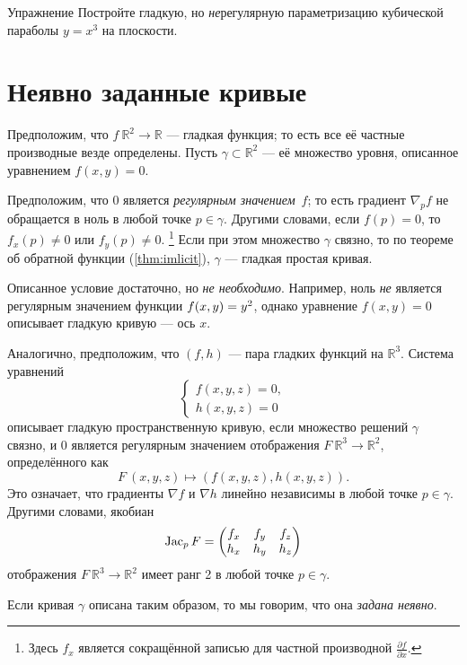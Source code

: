 \begin{thm}{Упражнение}\label{ex:nonregular}
Постройте гладкую, но \textit{не}регулярную параметризацию кубической параболы $y=x^3$ на плоскости.
\end{thm}

\section{Неявно заданные кривые}\label{sec:implicit-curves}

Предположим, что $f\:\mathbb{R}^2\to \mathbb{R}$ --- гладкая функция; 
то есть все её частные производные везде определены.
Пусть $\gamma\subset \mathbb{R}^2$ --- её множество уровня, описанное уравнением $f(x,y)=0$.

Предположим, что $0$ является \emph{регулярным значением}~$f$; то есть градиент $\nabla_p f$ не обращается в ноль в любой точке $p\in \gamma$.
Другими словами, если $f(p)=0$, то   
$f_x(p)\ne 0$ или $f_y(p)\ne 0$.%
\footnote{Здесь $f_x$ является сокращённой записью для частной производной
$\tfrac{\partial f}{\partial x}$.}
Если при этом множество $\gamma$ связно, то по теореме об обратной функции (\ref{thm:imlicit}), $\gamma$ --- гладкая простая кривая. 

Описанное условие достаточно, но \textit{не необходимо}.
Например, ноль \textit{не} является регулярным значением функции $f(x,y)\z=y^2$, однако уравнение $f(x,y)=0$ описывает гладкую кривую --- ось $x$.

Аналогично, предположим, что $(f,h)$ --- пара гладких функций на $\mathbb{R}^3$.
Система уравнений
\[\begin{cases}
   f(x,y,z)=0,
   \\
   h(x,y,z)=0
  \end{cases}
\]
описывает гладкую пространственную кривую, если множество решений $\gamma$ связно, и $0$ является регулярным значением отображения $F\:\mathbb{R}^3\to\mathbb{R}^2$, определённого как
\[F\:(x,y,z)\mapsto (f(x,y,z),h(x,y,z)).\]
Это означает, что градиенты $\nabla f$ и $\nabla h$ линейно независимы в любой точке $p\in \gamma$.
Другими словами, якобиан
\[
\mathop{\rm Jac}\nolimits_pF=\begin{pmatrix}
f_x&f_y&f_z\\
h_x&h_y&h_z
\end{pmatrix}
\]
отображения $F\:\mathbb{R}^3\to\mathbb{R}^2$ имеет ранг 2 в любой точке $p \in \gamma$.

Если кривая $\gamma$ описана таким образом,
то мы говорим, что она \emph{задана неявно}.

